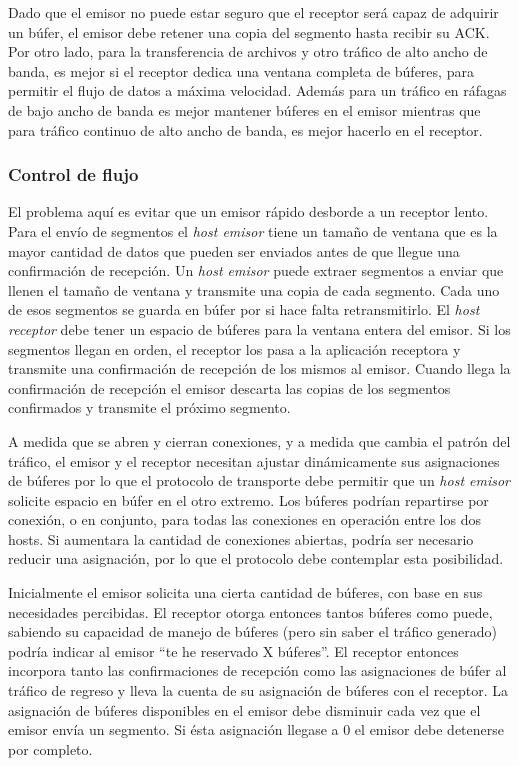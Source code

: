 \documentclass[10pt,a4paper]{report}
\begin{document}
	\par Dado que el emisor no puede estar seguro que el receptor será capaz de adquirir un búfer, el emisor debe retener una copia del segmento hasta recibir su ACK. Por otro lado, para la transferencia de archivos y otro tráfico de alto ancho de banda, es mejor si el receptor dedica una ventana completa de búferes, para permitir el flujo de datos a máxima velocidad. Además para un tráfico en ráfagas de bajo ancho de banda es mejor mantener búferes en el emisor mientras que para tráfico continuo de alto ancho de banda, es mejor hacerlo en el receptor.
	
\subsubsection{Control de flujo}

	\par El problema aquí es evitar que un emisor rápido desborde a un receptor lento. Para el envío de segmentos el \textit{host emisor} tiene un tamaño de ventana que es la mayor cantidad de datos que pueden ser enviados antes de que llegue una confirmación de recepción. Un \textit{host emisor} puede extraer segmentos a enviar que llenen el tamaño de ventana y transmite una copia de cada segmento. Cada uno de esos segmentos se guarda en búfer por si hace falta retransmitirlo. El \textit{host receptor} debe tener un espacio de búferes para la ventana entera del emisor. Si los segmentos llegan en orden, el receptor los pasa a la aplicación receptora y transmite una confirmación de recepción de los mismos al emisor. Cuando llega la confirmación de recepción el emisor descarta las copias de los segmentos confirmados y transmite el próximo segmento.

	\par A medida que se abren y cierran conexiones, y a medida que cambia el patrón del tráfico, el emisor y el receptor necesitan ajustar dinámicamente sus asignaciones de búferes por lo que el protocolo de transporte debe permitir que un \textit{host emisor} solicite espacio en búfer en el otro extremo. Los búferes podrían repartirse por conexión, o en conjunto, para todas las conexiones en operación entre los dos hosts. Si aumentara la cantidad de conexiones abiertas, podría ser necesario reducir una asignación, por lo que el protocolo debe contemplar esta posibilidad.
	
	\par Inicialmente el emisor solicita una cierta cantidad de búferes, con base en sus necesidades percibidas. El receptor otorga entonces tantos búferes como puede, sabiendo su capacidad de manejo de búferes (pero sin saber el tráfico generado) podría indicar al emisor “te he reservado X búferes”. El receptor entonces incorpora tanto las confirmaciones de recepción como las asignaciones de búfer al tráfico de regreso y lleva la cuenta de su asignación de búferes con el receptor. La asignación de búferes disponibles en el emisor debe disminuir cada vez que el emisor envía un segmento. Si ésta asignación llegase a 0 el emisor debe detenerse por completo.
\end{document}
